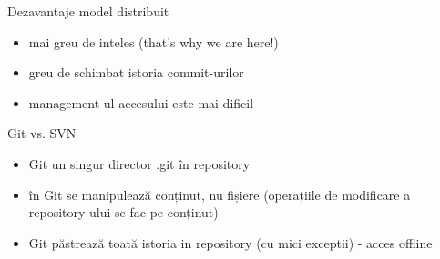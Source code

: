 \documentclass{beamer}
\begin{document}
\begin{frame}{Dezavantaje model distribuit}
\begin{itemize} %
\item mai greu de inteles (that's why we are here!)
\item greu de schimbat istoria commit-urilor
\item management-ul accesului este mai dificil
\end{itemize}
\end{frame}

\begin{frame}{Git vs. SVN}
\begin{itemize} %
\item Git un singur director .git în repository
\item în Git se manipulează conținut, nu fișiere (operațiile de modificare a repository-ului se fac pe conținut)
\item Git păstrează toată istoria in repository (cu mici exceptii) - acces offline
\end{itemize}
\end{frame}

\end{document}
